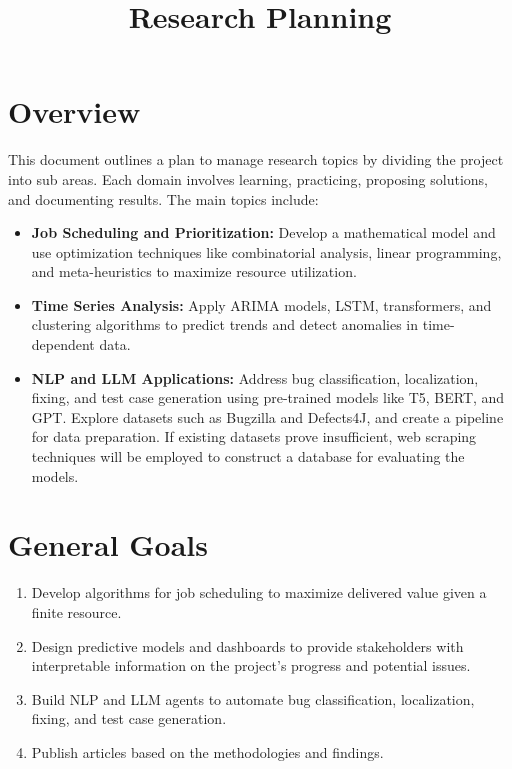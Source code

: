 \documentclass[12pt]{article}
\title{Research Planning}
\author{}
\date{}
\begin{document}
\maketitle

\section*{Overview}

This document outlines a plan to manage research topics by dividing the project into sub areas. Each domain involves learning, practicing, proposing solutions, and documenting results. The main topics include:

\begin{itemize}
    \item \textbf{Job Scheduling and Prioritization:} Develop a mathematical model and use optimization techniques like combinatorial analysis, linear programming, and meta-heuristics to maximize resource utilization.

    \item \textbf{Time Series Analysis:} Apply ARIMA models, LSTM, transformers, and clustering algorithms to predict trends and detect anomalies in time-dependent data.

    \item \textbf{NLP and LLM Applications:} Address bug classification, localization, fixing, and test case generation using pre-trained models like T5, BERT, and GPT. Explore datasets such as Bugzilla and Defects4J, and create a pipeline for data preparation. If existing datasets prove insufficient, web scraping techniques will be employed to construct a database for evaluating the models.
\end{itemize}

\section*{General Goals}
\begin{enumerate}
    \item Develop algorithms for job scheduling to maximize delivered value given a finite resource.
    \item Design predictive models and dashboards to provide stakeholders with interpretable information on the project's progress and potential issues.
    \item Build NLP and LLM agents to automate bug classification, localization, fixing, and test case generation.
    \item Publish articles based on the methodologies and findings.
\end{enumerate}
\end{document}
